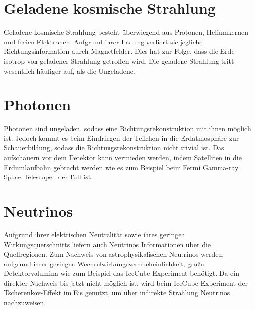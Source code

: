 \section*{Geladene kosmische Strahlung}
Geladene kosmische Strahlung besteht überwiegend aus Protonen, Heliumkernen und freien Elektronen. 
Aufgrund ihrer Ladung verliert sie jegliche Richtungsinformation durch Magnetfelder. 
Dies hat zur Folge, dass die Erde isotrop von geladener Strahlung getroffen wird.
Die geladene Strahlung tritt wesentlich häufiger auf, als die Ungeladene. 

\section*{Photonen}
Photonen sind ungeladen, sodass eine Richtungsrekonstruktion mit ihnen möglich ist. 
Jedoch kommt es beim Eindringen der Teilchen in die Erdatmosphäre zur Schauerbildung, sodass die Richtungsrekonstruktion nicht trivial ist. 
Das aufschauern vor dem Detektor kann vermieden werden, indem Satelliten in die Erdumlaufbahn gebracht werden wie es zum Beispiel beim Fermi Gamma-ray Space Telescope~\cite{fermi} der Fall ist.

\section*{Neutrinos}
Aufgrund ihrer elektrischen Neutralität sowie ihres geringen Wirkungsquerschnitts liefern auch Neutrinos Informationen über die Quellregionen. 
Zum Nachweis von astrophysikalischen Neutrinos werden, aufgrund ihrer geringen Wechselwirkungswahrscheinlichkeit, große Detektorvolumina wie zum Beispiel das IceCube Experiment benötigt.
Da ein direkter Nachweis bis jetzt nicht möglich ist, wird beim IceCube Experiment \cite{icecube} der Tscherenkov-Effekt im Eis genutzt, um über indirekte Strahlung Neutrinos nachzuweisen.
